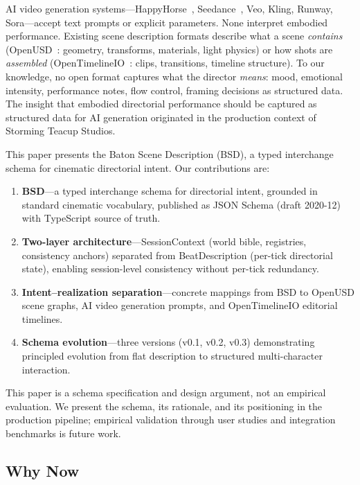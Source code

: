 \documentclass{article}
\begin{document}
AI video generation systems---HappyHorse~\cite{happyhorse2026}, Seedance~\cite{seedance2026}, Veo, Kling, Runway, Sora---accept text prompts or explicit parameters. None interpret embodied performance. Existing scene description formats describe what a scene \emph{contains} (OpenUSD~\cite{openusd2016}: geometry, transforms, materials, light physics) or how shots are \emph{assembled} (OpenTimelineIO~\cite{otio2018}: clips, transitions, timeline structure). To our knowledge, no open format captures what the director \emph{means}: mood, emotional intensity, performance notes, flow control, framing decisions as structured data. The insight that embodied directorial performance should be captured as structured data for AI generation originated in the production context of Storming Teacup Studios.

This paper presents the Baton Scene Description (BSD), a typed interchange schema for cinematic directorial intent. Our contributions are:

\begin{enumerate}
  \item \textbf{BSD}---a typed interchange schema for directorial intent, grounded in standard cinematic vocabulary, published as JSON Schema (draft 2020-12) with TypeScript source of truth.
  \item \textbf{Two-layer architecture}---SessionContext (world bible, registries, consistency anchors) separated from BeatDescription (per-tick directorial state), enabling session-level consistency without per-tick redundancy.
  \item \textbf{Intent--realization separation}---concrete mappings from BSD to OpenUSD scene graphs, AI video generation prompts, and OpenTimelineIO editorial timelines.
  \item \textbf{Schema evolution}---three versions (v0.1, v0.2, v0.3) demonstrating principled evolution from flat description to structured multi-character interaction.
\end{enumerate}

This paper is a schema specification and design argument, not an empirical evaluation. We present the schema, its rationale, and its positioning in the production pipeline; empirical validation through user studies and integration benchmarks is future work.

\subsection{Why Now}
\end{document}
